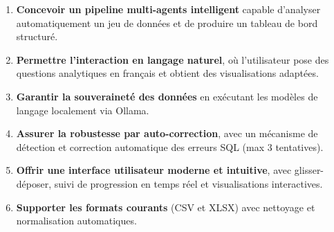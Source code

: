 \begin{enumerate}[label=\textbf{O\arabic*.}, leftmargin=2cm]
    \item \textbf{Concevoir un pipeline multi-agents intelligent} capable d'analyser automatiquement un jeu de données et de produire un tableau de bord structuré.
    \item \textbf{Permettre l'interaction en langage naturel}, où l'utilisateur pose des questions analytiques en français et obtient des visualisations adaptées.
    \item \textbf{Garantir la souveraineté des données} en exécutant les modèles de langage localement via Ollama.
    \item \textbf{Assurer la robustesse par auto-correction}, avec un mécanisme de détection et correction automatique des erreurs SQL (max 3 tentatives).
    \item \textbf{Offrir une interface utilisateur moderne et intuitive}, avec glisser-déposer, suivi de progression en temps réel et visualisations interactives.
    \item \textbf{Supporter les formats courants} (CSV et XLSX) avec nettoyage et normalisation automatiques.
\end{enumerate}



